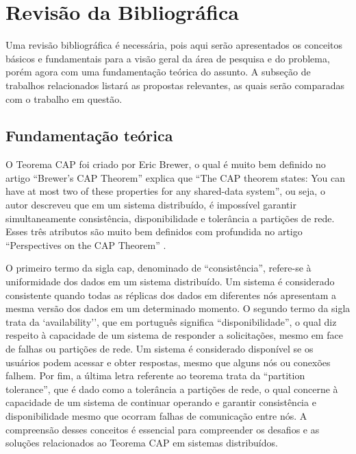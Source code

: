 \chapter{Revisão da Bibliográfica}
\label{cap:trabalhos:relacionados}
Uma revisão bibliográfica é necessária, pois aqui serão apresentados os conceitos básicos e fundamentais para a visão geral da área de pesquisa e do problema, porém agora com uma fundamentação teórica do assunto. A subseção de trabalhos relacionados listará as propostas relevantes, as quais serão comparadas com o trabalho em questão.

\section{Fundamentação teórica}

O Teorema CAP foi criado por Eric Brewer, o qual é muito bem definido no artigo ``Brewer's CAP Theorem'' \cite{BrewerCAPTheoremSimonSalome} explica que ``The CAP theorem states: You can have at most two of these properties for any shared-data system'', ou seja, o autor descreveu que em um sistema distribuído, é impossível garantir simultaneamente consistência, disponibilidade e tolerância a partições de rede. Esses três atributos são muito bem definidos com profundida no artigo ``Perspectives on the CAP Theorem'' \cite{PerspectivesCAPTheoremGilbertLynch2012}.

O primeiro termo da sigla \gls{cap}, denominado de ``consistência'', refere-se à uniformidade dos dados em um sistema distribuído. Um sistema é considerado consistente quando todas as réplicas dos dados em diferentes nós apresentam a mesma versão dos dados em um determinado momento.
O segundo termo da sigla trata da `availability'', que em português significa ``disponibilidade'', o qual diz respeito à capacidade de um sistema de responder a solicitações, mesmo em face de falhas ou partições de rede. Um sistema é considerado disponível se os usuários podem acessar e obter respostas, mesmo que alguns nós ou conexões falhem. Por fim, a última letra referente ao teorema trata da ``partition tolerance'', que é dado como a tolerância a partições de rede, o qual concerne à capacidade de um sistema de continuar operando e garantir consistência e disponibilidade mesmo que ocorram falhas de comunicação entre nós.
A compreensão desses conceitos é essencial para compreender os desafios e as soluções relacionados ao Teorema CAP em sistemas distribuídos.

